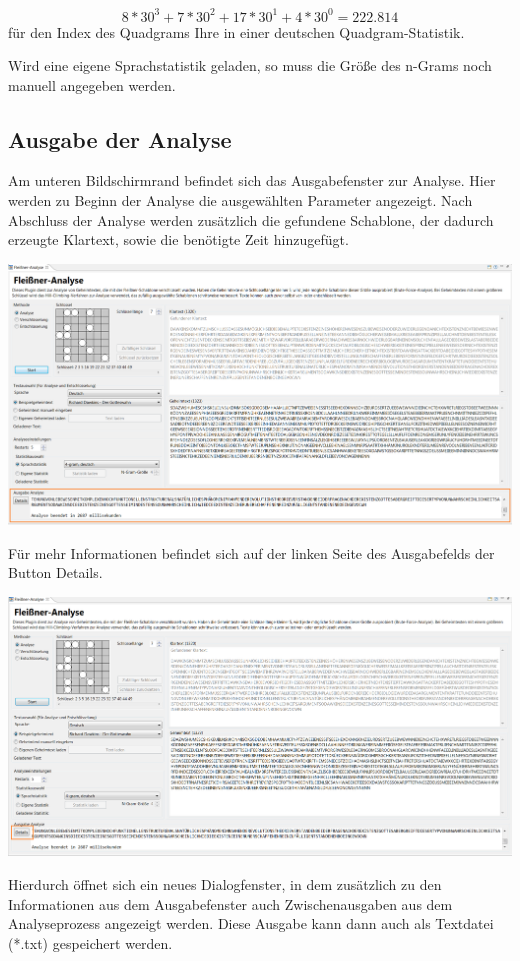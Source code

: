 \documentclass[fontsize=12pt, DIV=15, parskip=half-]{scrartcl}
\theoremstyle{break}
\begin{document}
\[ 
8*30^3 + 7*30^2 + 17* 30^1+4*30^0 = 222.814
\]
für den Index des Quadgrams \glqq Ihre\grqq{} in einer deutschen Quadgram-Statistik.

Wird eine eigene Sprachstatistik geladen, so muss die Größe des n-Grams noch manuell angegeben werden.
\newpage

\subsection{Ausgabe der Analyse}

Am unteren Bildschirmrand befindet sich das Ausgabefenster zur Analyse.
Hier werden zu Beginn der Analyse die ausgewählten Parameter angezeigt. Nach Abschluss der Analyse werden zusätzlich die gefundene Schablone, der dadurch erzeugte Klartext, sowie die benötigte Zeit hinzugefügt.

\includegraphics[scale=0.45]{FleissnerAusgabeAnalyse.png}

Für mehr Informationen befindet sich auf der linken Seite des Ausgabefelds der Button \glqq Details\grqq. 

\includegraphics[scale=0.45]{FleissnerAusgabeAnalyseDetailButton.png}

Hierdurch öffnet sich ein neues Dialogfenster, in dem zusätzlich zu den Informationen aus dem Ausgabefenster auch Zwischenausgaben aus dem Analyseprozess angezeigt werden. Diese Ausgabe kann dann auch als Textdatei (*.txt) gespeichert werden.
\end{document}
